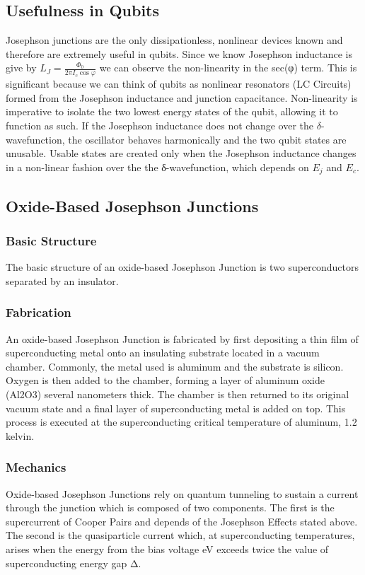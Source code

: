 \documentclass[conf]{new-aiaa}
\begin{document}
\subsection{Usefulness in Qubits}
Josephson junctions are the only dissipationless, nonlinear devices known and therefore are extremely useful in qubits. Since we know Josephson inductance is give by $L_J = \frac{\Phi_0}{2\pi I_c \cos{\varphi}}$ we can observe the non-linearity in the sec(φ) term. This is significant because we can think of qubits as nonlinear resonators (LC Circuits) formed from the Josephson inductance and junction capacitance. Non-linearity is imperative to isolate the two lowest energy states of the qubit, allowing it to function as such. If the Josephson inductance does not change over the $δ$-wavefunction, the oscillator behaves harmonically and the two qubit states are unusable.  Usable states are created only when the Josephson inductance changes in a non-linear fashion over the the δ-wavefunction, which depends on  $E_j$ and $E_c$.


\subsection{Oxide-Based Josephson Junctions}
\subsubsection{Basic Structure}
The basic structure of an oxide-based Josephson Junction is two superconductors separated by an insulator. 

\subsubsection{Fabrication}
An oxide-based Josephson Junction is fabricated by first depositing a thin film of superconducting metal onto an insulating substrate located in a vacuum chamber. Commonly, the metal used is aluminum and the substrate is silicon. Oxygen is then added to the chamber, forming a layer of aluminum oxide (Al2O3) several nanometers thick. The chamber is then returned to its original vacuum state and a final layer of superconducting metal is added on top. This process is executed at the superconducting critical temperature of aluminum, 1.2 kelvin. 

\subsubsection{Mechanics}
Oxide-based Josephson Junctions rely on quantum tunneling to sustain a current through the junction which is composed of two components. The first is the supercurrent of Cooper Pairs and depends of the Josephson Effects stated above. The second is the quasiparticle current which, at superconducting temperatures, arises when the energy from the bias voltage eV exceeds twice the value of superconducting energy gap Δ. 
\end{document}
